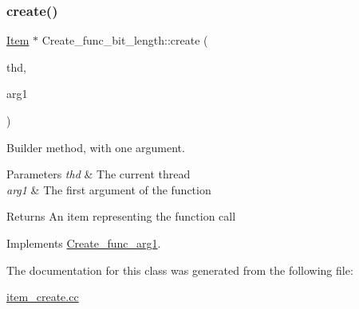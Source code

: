 \subsubsection{\texorpdfstring{create()}{create()}}
{\footnotesize\ttfamily \mbox{\hyperlink{classItem}{Item}} $\ast$ Create\+\_\+func\+\_\+bit\+\_\+length\+::create (\begin{DoxyParamCaption}\item[{T\+HD $\ast$}]{thd,  }\item[{\mbox{\hyperlink{classItem}{Item}} $\ast$}]{arg1 }\end{DoxyParamCaption})\hspace{0.3cm}{\ttfamily [virtual]}}

Builder method, with one argument. 
\begin{DoxyParams}{Parameters}
{\em thd} & The current thread \\
\hline
{\em arg1} & The first argument of the function \\
\hline
\end{DoxyParams}
\begin{DoxyReturn}{Returns}
An item representing the function call 
\end{DoxyReturn}


Implements \mbox{\hyperlink{classCreate__func__arg1_a3e9a98f755cd82c3e762e334c955a8c9}{Create\+\_\+func\+\_\+arg1}}.



The documentation for this class was generated from the following file\+:\begin{DoxyCompactItemize}
\item 
\mbox{\hyperlink{item__create_8cc}{item\+\_\+create.\+cc}}\end{DoxyCompactItemize}
